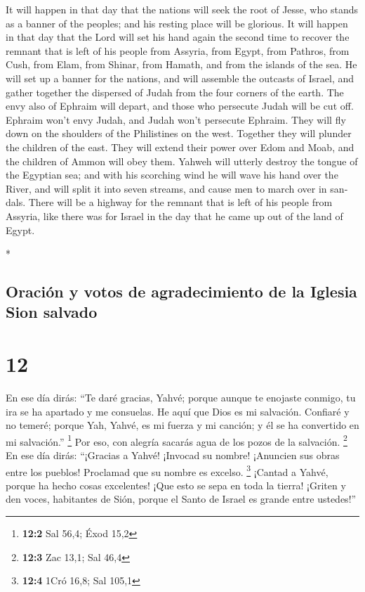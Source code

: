 \begin{paracol}{2}
\begin{otherlanguage}{english}
 It will happen in that day that the nations will seek
the root of Jesse, who stands as a banner of the peoples; and his
resting place will be glorious.  It will happen in that
day that the Lord will set his hand again the second time to recover the
remnant that is left of his people from Assyria, from Egypt, from
Pathros, from Cush, from Elam, from Shinar, from Hamath, and from the
islands of the sea.  He will set up a banner for the
nations, and will assemble the outcasts of Israel, and gather together
the dispersed of Judah from the four corners of the earth.
 The envy also of Ephraim will depart, and those who
persecute Judah will be cut off. Ephraim won't envy Judah, and Judah
won't persecute Ephraim.  They will fly down on the
shoulders of the Philistines on the west. Together they will plunder the
children of the east. They will extend their power over Edom and Moab,
and the children of Ammon will obey them.  Yahweh will
utterly destroy the tongue of the Egyptian sea; and with his scorching
wind he will wave his hand over the River, and will split it into seven
streams, and cause men to march over in sandals.  There
will be a highway for the remnant that is left of his people from
Assyria, like there was for Israel in the day that he came up out of the
land of Egypt.

\end{otherlanguage}

\switchcolumn[0]*

\hypertarget{oraciuxf3n-y-votos-de-agradecimiento-de-la-iglesia-sion-salvado}{%
\subsection{Oración y votos de agradecimiento de la Iglesia Sion
salvado}\label{oraciuxf3n-y-votos-de-agradecimiento-de-la-iglesia-sion-salvado}}

\hypertarget{section-22}{%
\section{12}\label{section-22}}

 En ese día dirás: ``Te daré gracias, Yahvé; porque aunque
te enojaste conmigo, tu ira se ha apartado y me consuelas.
 He aquí que Dios es mi salvación. Confiaré y no temeré;
porque Yah, Yahvé, es mi fuerza y mi canción; y él se ha convertido en
mi salvación.'' \footnote{\textbf{12:2} Sal 56,4; Éxod 15,2}
 Por eso, con alegría sacarás agua de los pozos de la
salvación. \footnote{\textbf{12:3} Zac 13,1; Sal 46,4}  En
ese día dirás: ``¡Gracias a Yahvé! ¡Invocad su nombre! ¡Anuncien sus
obras entre los pueblos! Proclamad que su nombre es excelso. \footnote{\textbf{12:4}
  1Cró 16,8; Sal 105,1}  ¡Cantad a Yahvé, porque ha hecho
cosas excelentes! ¡Que esto se sepa en toda la tierra! 
¡Griten y den voces, habitantes de Sión, porque el Santo de Israel es
grande entre ustedes!''


\end{paracol}
